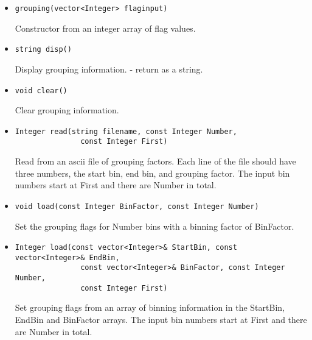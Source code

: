 \documentclass[11pt]{book}
\begin{document}
\begin{itemize}

\item  \begin{verbatim}grouping(vector<Integer> flaginput) \end{verbatim}

          Constructor from an integer array of flag values.

\item  \begin{verbatim}string disp() \end{verbatim}  

          Display grouping information. - return as a string.

\item  \begin{verbatim}void clear() \end{verbatim}  

          Clear grouping information.

\item  \begin{verbatim}Integer read(string filename, const Integer Number, 
               const Integer First) \end{verbatim}

          Read from an ascii file of grouping factors. Each line of
          the file should have three numbers, the start bin, end bin, and
          grouping factor. The input bin numbers start at First and
          there are Number in total.

\item  \begin{verbatim}void load(const Integer BinFactor, const Integer Number) \end{verbatim}

          Set the grouping flags for Number bins with a binning factor
          of BinFactor.

\item  \begin{verbatim}Integer load(const vector<Integer>& StartBin, const vector<Integer>& EndBin, 
               const vector<Integer>& BinFactor, const Integer Number, 
               const Integer First) \end{verbatim}

          Set grouping flags from an array of binning information in
          the StartBin, EndBin and BinFactor arrays. The input bin
          numbers start at First and there are Number in total.


\end{itemize}
\end{document}
